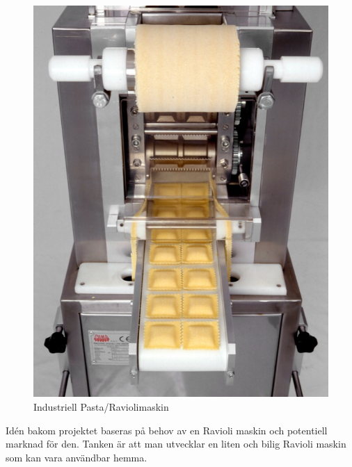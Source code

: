  		\begin{figure}[h]
 			\begin{center}
 				\includegraphics[scale=3]{images/pastamachine.jpg}
 				\caption{Industriell Pasta/Raviolimaskin}
 				\label{pastamaskin}	
 			\end{center}
 		\end{figure}

Idén bakom projektet baseras på behov av en Ravioli maskin och potentiell marknad för den. Tanken är att man utvecklar en liten och bilig Ravioli maskin som kan vara användbar hemma.		